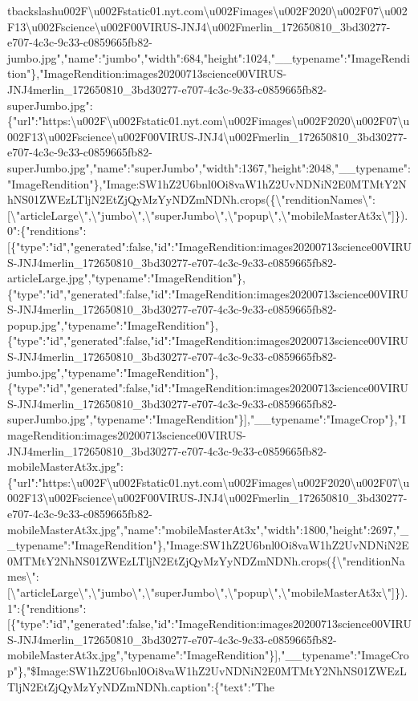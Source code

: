 tbackslash{}u002F\textbackslash{}u002Fstatic01.nyt.com\textbackslash{}u002Fimages\textbackslash{}u002F2020\textbackslash{}u002F07\textbackslash{}u002F13\textbackslash{}u002Fscience\textbackslash{}u002F00VIRUS-JNJ4\textbackslash{}u002Fmerlin\_172650810\_3bd30277-e707-4c3c-9c33-c0859665fb82-jumbo.jpg","name":"jumbo","width":684,"height":1024,"\_\_typename":"ImageRendition"\},"ImageRendition:images20200713science00VIRUS-JNJ4merlin\_172650810\_3bd30277-e707-4c3c-9c33-c0859665fb82-superJumbo.jpg":\{"url":"https:\textbackslash{}u002F\textbackslash{}u002Fstatic01.nyt.com\textbackslash{}u002Fimages\textbackslash{}u002F2020\textbackslash{}u002F07\textbackslash{}u002F13\textbackslash{}u002Fscience\textbackslash{}u002F00VIRUS-JNJ4\textbackslash{}u002Fmerlin\_172650810\_3bd30277-e707-4c3c-9c33-c0859665fb82-superJumbo.jpg","name":"superJumbo","width":1367,"height":2048,"\_\_typename":"ImageRendition"\},"Image:SW1hZ2U6bnl0Oi8vaW1hZ2UvNDNiN2E0MTMtY2NhNS01ZWEzLTljN2EtZjQyMzYyNDZmNDNh.crops(\{\textbackslash{}"renditionNames\textbackslash{}":{[}\textbackslash{}"articleLarge\textbackslash{}",\textbackslash{}"jumbo\textbackslash{}",\textbackslash{}"superJumbo\textbackslash{}",\textbackslash{}"popup\textbackslash{}",\textbackslash{}"mobileMasterAt3x\textbackslash{}"{]}\}).0":\{"renditions":{[}\{"type":"id","generated":false,"id":"ImageRendition:images20200713science00VIRUS-JNJ4merlin\_172650810\_3bd30277-e707-4c3c-9c33-c0859665fb82-articleLarge.jpg","typename":"ImageRendition"\},\{"type":"id","generated":false,"id":"ImageRendition:images20200713science00VIRUS-JNJ4merlin\_172650810\_3bd30277-e707-4c3c-9c33-c0859665fb82-popup.jpg","typename":"ImageRendition"\},\{"type":"id","generated":false,"id":"ImageRendition:images20200713science00VIRUS-JNJ4merlin\_172650810\_3bd30277-e707-4c3c-9c33-c0859665fb82-jumbo.jpg","typename":"ImageRendition"\},\{"type":"id","generated":false,"id":"ImageRendition:images20200713science00VIRUS-JNJ4merlin\_172650810\_3bd30277-e707-4c3c-9c33-c0859665fb82-superJumbo.jpg","typename":"ImageRendition"\}{]},"\_\_typename":"ImageCrop"\},"ImageRendition:images20200713science00VIRUS-JNJ4merlin\_172650810\_3bd30277-e707-4c3c-9c33-c0859665fb82-mobileMasterAt3x.jpg":\{"url":"https:\textbackslash{}u002F\textbackslash{}u002Fstatic01.nyt.com\textbackslash{}u002Fimages\textbackslash{}u002F2020\textbackslash{}u002F07\textbackslash{}u002F13\textbackslash{}u002Fscience\textbackslash{}u002F00VIRUS-JNJ4\textbackslash{}u002Fmerlin\_172650810\_3bd30277-e707-4c3c-9c33-c0859665fb82-mobileMasterAt3x.jpg","name":"mobileMasterAt3x","width":1800,"height":2697,"\_\_typename":"ImageRendition"\},"Image:SW1hZ2U6bnl0Oi8vaW1hZ2UvNDNiN2E0MTMtY2NhNS01ZWEzLTljN2EtZjQyMzYyNDZmNDNh.crops(\{\textbackslash{}"renditionNames\textbackslash{}":{[}\textbackslash{}"articleLarge\textbackslash{}",\textbackslash{}"jumbo\textbackslash{}",\textbackslash{}"superJumbo\textbackslash{}",\textbackslash{}"popup\textbackslash{}",\textbackslash{}"mobileMasterAt3x\textbackslash{}"{]}\}).1":\{"renditions":{[}\{"type":"id","generated":false,"id":"ImageRendition:images20200713science00VIRUS-JNJ4merlin\_172650810\_3bd30277-e707-4c3c-9c33-c0859665fb82-mobileMasterAt3x.jpg","typename":"ImageRendition"\}{]},"\_\_typename":"ImageCrop"\},"\$Image:SW1hZ2U6bnl0Oi8vaW1hZ2UvNDNiN2E0MTMtY2NhNS01ZWEzLTljN2EtZjQyMzYyNDZmNDNh.caption":\{"text":"The
